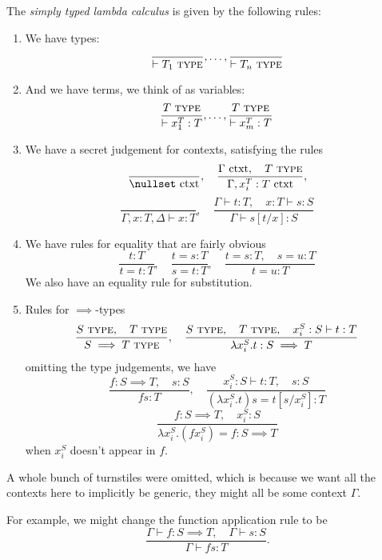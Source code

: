 \documentclass{article}
\newcommand{\yields}{\vdash}
\begin{document}
\begin{definition}
    \newcommand\TYPE{\text{ \scshape{type}}}
    \newcommand\ctxt{\text{ ctxt}}
    The \emph{simply typed lambda calculus} is given by the following 
    rules:
    \begin{enumerate}
        \item We have types:
        \[ \frac{\quad}{\yields T_1\text{ \scshape{type}}}
        ,\ldots, 
        \frac{}{\yields T_n\TYPE}
        \]
        \item And we have terms, we think of as variables:
        \[ \frac{T\TYPE}{\yields x_1^T:T}, \ldots, 
        \frac{T\TYPE}{\yields x_m^T:T}
        \]
        \item We have a secret judgement for contexts, 
            satisfying the rules
            \[\frac{}{\nullset \text{ ctxt}},
            \quad
            \frac{\Gamma\ctxt, \quad T\TYPE}{\Gamma,x_i^T:T \ctxt},
            \]
            \[ \frac{}{\Gamma,x:T,\Delta \yields x:T},
            \quad
            \frac{\Gamma\yields t:T,\quad x:T\yields s:S}{
                \Gamma \yields s[t/x] : S
            }
            \]
        \item We have rules for equality that are fairly obvious
            \[\frac{t:T}{t=t:T},
            \quad 
            \frac{t=s:T}{s=t:T},
            \quad 
            \frac{t=s:T,\quad s=u:T}{t=u:T}
            \]
            We also have an equality rule for substitution.
        \item Rules for $\implies$-types
            \[\frac{S\TYPE,\quad T\TYPE}{
                S\implies T \TYPE
            },
            \quad
            \frac{
                S\TYPE,\quad T\TYPE,\quad x_i^S:S\yields t:T
            }{
                \lambda x_i^S.t:S\implies T
            }
            \]
            omitting the type judgements, we have
            \[ \frac{f:S\implies T, \quad s:S}{
                fs:T
            },\quad 
            \frac{x_i^S:S\yields t:T, \quad s:S}{
                (\lambda x_i^S.t)s = t[s/x_i^S]:T
            }
            \]
            \[ \frac{f:S\implies T,\quad x_i^S:S}{
                \lambda x_i^S.(fx_i^S) = f : S\implies T
            }\]
            when $x_i^S$ doesn't appear in $f$.
    \end{enumerate}
    A whole bunch of turnstiles were omitted, which is because we 
    want all the contexts here to implicitly be generic, they 
    might all be some context $\Gamma$.

    For example, we might change the function application rule to
    be 
    \[\frac{\Gamma \yields f : S\implies T,
     \quad \Gamma \yields s:S}{
        \Gamma\yields fs:T}.
    \]
\end{definition}
\end{document}
